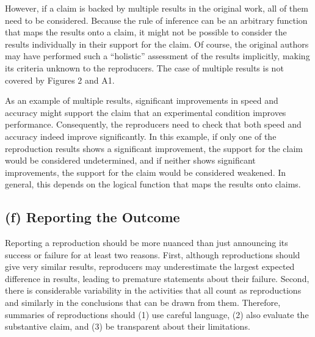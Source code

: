 \documentclass[authordate, meta]{jote-new-article}
\begin{document}
	However, if a claim is backed by multiple results in the original work, all of them need to be considered. Because the rule of inference can be an arbitrary function that maps the results onto a claim, it might not be possible to consider the results individually in their support for the claim. Of course, the original authors may have performed such a “holistic” assessment of the results implicitly, making its criteria unknown to the reproducers. The case of multiple results is not covered by Figures 2 and A1.


	As an example of multiple results, significant improvements in speed and accuracy might support the claim that an experimental condition improves performance. Consequently, the reproducers need to check that both speed and accuracy indeed improve significantly. In this example, if only one of the reproduction results shows a significant improvement, the support for the claim would be considered undetermined, and if neither shows significant improvements, the support for the claim would be considered weakened. In general, this depends on the logical function that maps the results onto claims.

	

	\subsection{(f) Reporting the Outcome}

	Reporting a reproduction should be more nuanced than just announcing its success or failure for at least two reasons. First, although reproductions should give very similar results, reproducers may underestimate the largest expected difference in results, leading to premature statements about their failure. Second, there is considerable variability in the activities that all count as reproductions and similarly in the conclusions that can be drawn from them. Therefore, summaries of reproductions should (1) use careful language, (2) also evaluate the substantive claim, and (3) be transparent about their limitations.
\end{document}
